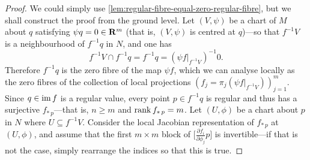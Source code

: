 \begin{proof}
    We could simply use \cref{lem:regular-fibre-equal-zero-regular-fibre}, but we
    shall construct the proof from the ground level. Let \((V, \psi)\) be a chart of
    \(M\) about \(q\) satisfying \(\psi q = 0 \in \mathbf{R}^m\) (that is, \((V, \psi)\) is
    centred at \(q\))---so that \(f^{-1} V\) is a neighbourhood of \(f^{-1} q\) in
    \(N\), and one has
    \[
        f^{-1} V \cap f^{-1} q = f^{-1} q = (\psi f|_{f^{-1} V})^{-1} 0.
    \]
    Therefore \(f^{-1} q\) is the zero fibre of the map \(\psi f\), which we can
    analyse locally as the zero fibres of the collection of local projections
    \((f_j = \pi_j (\psi f|_{f^{-1} V}))_{j=1}^m\). Since \(q \in \operatorname{im} f\) is a regular value,
    every point \(p \in f^{-1} q\) is regular and thus has a surjective
    \(f_{*\, p}\)---that is, \(n \geq m\) and \(\operatorname{rank} f_{*\, p} = m\). Let
    \((U, \phi)\) be a chart about \(p\) in \(N\) where \(U \subseteq f^{-1} V\).
    Consider the local Jacobian representation of \(f_{*\, p}\) at \((U, \phi)\),
    and assume that the first \(m \times m\) block of
    \(\big[ \frac{\partial f_i}{\partial \phi_j} p \big]\) is invertible---if that
    is not the case, simply rearrange the indices so that this is true.


\end{proof}

